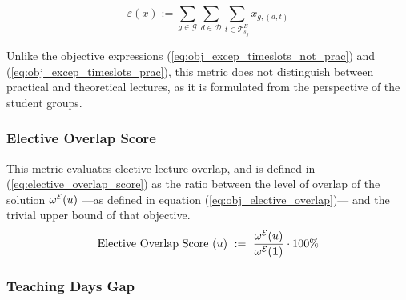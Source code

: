         \begin{equation}
            \varepsilon(x) := \sum_{g \in \mathcal{G}} \sum_{d\in\mathcal{D}} \sum_{t \in \mathcal{T}_{s_g}^E} x_{g,(d,t)}
            \label{eq:excep_ts_x}
        \end{equation}

        Unlike the objective expressions (\ref{eq:obj_excep_timeslots_not_prac}) and (\ref{eq:obj_excep_timeslots_prac}), this metric does not distinguish between practical and theoretical lectures, as it is formulated from the perspective of the student groups. 
        
        
    \vspace{1em}
    \subsubsection{Elective Overlap Score}

        This metric evaluates elective lecture overlap, and is defined in (\ref{eq:elective_overlap_score}) as the ratio between the level of overlap of the solution $\omega^{\mathcal{E}}(u)$ ---as defined in equation (\ref{eq:obj_elective_overlap})--- and the trivial upper bound of that objective.
        \begin{equation}
            \text{Elective Overlap Score } (u) \ := \  \frac{\omega^{\mathcal{E}}(u)}{\omega^{\mathcal{E}}(\mathbf{1})} \cdot 100\%
            \label{eq:elective_overlap_score}
        \end{equation}
       
    
    \vspace{1em}
    \subsubsection{Teaching Days Gap}

